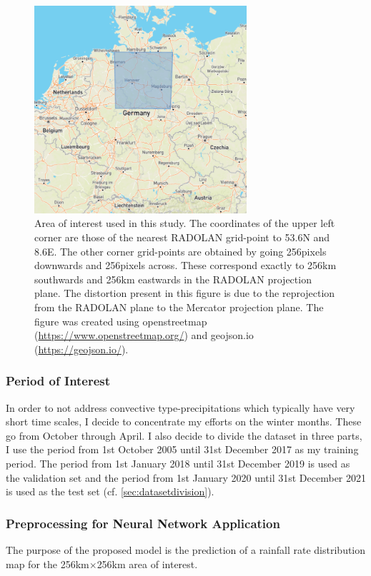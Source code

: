\begin{figure}[!h]
    \centering
    \includegraphics[width=0.7\textwidth]{dataset_selection.png}
    \caption{Area of interest used in this study. The coordinates of the upper left corner are those of the nearest RADOLAN grid-point to 53.6\textdegree N and 8.6\textdegree E. The other corner grid-points are obtained by going 256pixels downwards and 256pixels across. These correspond exactly to 256km southwards and 256km eastwards in the RADOLAN projection plane. The distortion present in this figure is due to the reprojection from the RADOLAN plane to the Mercator projection plane. The figure was created using openstreetmap (\hyperlink{https://www.openstreetmap.org/}{https://www.openstreetmap.org/}) and geojson.io (\hyperlink{https://geojson.io/}{https://geojson.io/}).}
    \label{fig:area_selection}
\end{figure}

\subsubsection{Period of Interest}
In order to not address convective type-precipitations which typically have very short time scales, I decide to concentrate my efforts on the winter months. These go from October through April. I also decide to divide the dataset in three parts, I use the period from 1st October 2005 until 31st December 2017 as my training period. The period from 1st January 2018 until 31st December 2019 is used as the validation set and the period from 1st January 2020 until 31st December 2021 is used as the test set (cf. \cref{sec:datasetdivision}).

\subsubsection{Preprocessing for Neural Network Application} \label{sec:algorithmretrieval}
The purpose of the proposed model is the prediction of a rainfall rate distribution map for the 256km$\times$256km area of interest.

